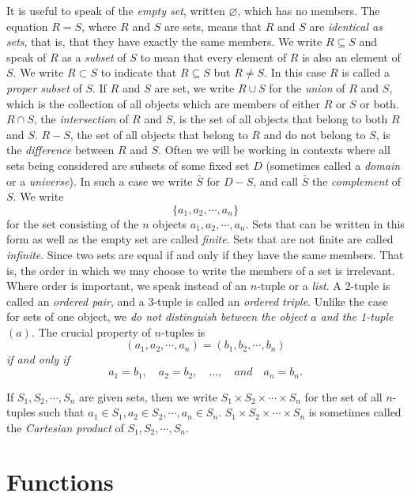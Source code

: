\documentclass[12pt,a4paper,twoside,openany]{book}
\begin{document}
It is useful to speak of the \textit{empty set}, written $\varnothing$, which has no members. The equation $R=S$, where $R$ and $S$ are sets, means that $R$ and $S$ are \textit{identical as sets}, that is, that they have exactly the same members. We write $R\subseteq S$ and speak of $R$ as a \textit{subset} of $S$ to mean that every element of $R$ is also an element of $S$. We write $R\subset S$ to indicate that $R\subseteq S$ but $R\neq S$. In this case $R$ is called a \textit{proper subset} of $S$. If $R$ and $S$ are set, we write $R\cup S$ for the \textit{union} of $R$ and $S$, which is the collection of all objects which are members of either $R$ or $S$ or both. $R\cap S$, the \textit{intersection} of $R$ and $S$, is the set of all objects that belong to both $R$ and $S$. $R-S$, the set of all objects that belong to $R$ and do not belong to $S$, is the \textit{difference} between $R$ and $S$. Often we will be working in contexts where all sets being considered are subsets of some fixed set $D$ (sometimes called a \textit{domain} or a \textit{universe}). In such a case we write $\bar{S}$ for $D-S$, and call $\bar{S}$ the \textit{complement} of $S$. We write $$\{a_1,a_2,\cdots,a_n\}$$ for the set consisting of the $n$ objects $a_1,a_2,\cdots,a_n$. Sets that can be written in this form as well as the empty set are called \textit{finite}. Sets that are not finite are called \textit{infinite}. Since two sets are equal if and only if they have the same members. That is, the order in which we may choose to write the members of a set is irrelevant. Where order is important, we speak instead of an $n$-tuple or a \textit{list}. A 2-tuple is called an \textit{ordered pair}, and a 3-tuple is called an \textit{ordered triple}. Unlike the case for sets of one object, we \textit{do not distinguish between the object $a$ and the 1-tuple $(a)$}. The crucial property of $n$-tuples is $$(a_1,a_2,\cdots,a_n)=(b_1,b_2,\cdots,b_n)$$ \textit{if and only if} $$a_{1}=b_{1} ,\quad a_{2}=b_{2} ,\quad\ldots,\quad and\quad a_{n}=b_{n}.$$

If $S_1,S_2,\cdots,S_n$ are given sets, then we write $S_1\times S_2\times\cdots\times S_n$ for the set of all $n$-tuples such that $a_1\in S_1,a_2\in S_2,\cdots,a_n\in S_n$. $S_1\times S_2\times\cdots\times S_n$ is sometimes called the \textit{Cartesian product} of $S_1,S_2,\cdots,S_n$.

\section{Functions}
\end{document}
